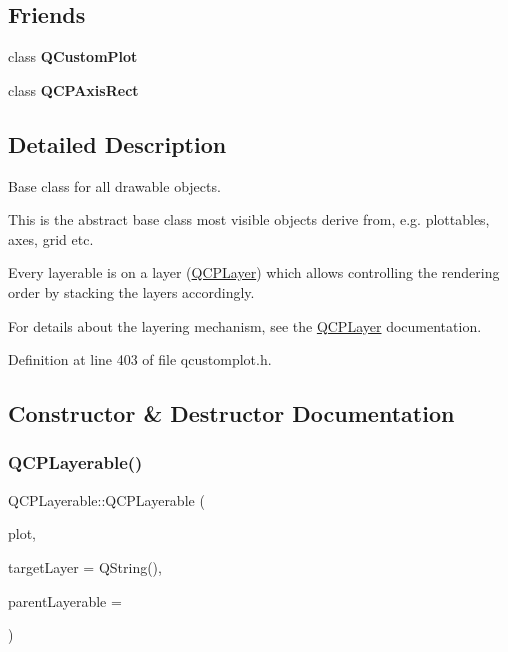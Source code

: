 \subsection*{Friends}
\begin{DoxyCompactItemize}
\item 
\mbox{\label{class_q_c_p_layerable_a1cdf9df76adcfae45261690aa0ca2198}} 
class {\bfseries Q\+Custom\+Plot}
\item 
\mbox{\label{class_q_c_p_layerable_acbf20ecb140f66c5fd1bc64ae0762990}} 
class {\bfseries Q\+C\+P\+Axis\+Rect}
\end{DoxyCompactItemize}


\subsection{Detailed Description}
Base class for all drawable objects. 

This is the abstract base class most visible objects derive from, e.\+g. plottables, axes, grid etc.

Every layerable is on a layer (\hyperlink{class_q_c_p_layer}{Q\+C\+P\+Layer}) which allows controlling the rendering order by stacking the layers accordingly.

For details about the layering mechanism, see the \hyperlink{class_q_c_p_layer}{Q\+C\+P\+Layer} documentation. 

Definition at line 403 of file qcustomplot.\+h.



\subsection{Constructor \& Destructor Documentation}
\mbox{\label{class_q_c_p_layerable_a74c0fa237f29bf0e49565013fc5d1ec0}} 
\subsubsection{\texorpdfstring{Q\+C\+P\+Layerable()}{QCPLayerable()}}
{\footnotesize\ttfamily Q\+C\+P\+Layerable\+::\+Q\+C\+P\+Layerable (\begin{DoxyParamCaption}\item[{\hyperlink{class_q_custom_plot}{Q\+Custom\+Plot} $\ast$}]{plot,  }\item[{Q\+String}]{target\+Layer = {\ttfamily QString()},  }\item[{\hyperlink{class_q_c_p_layerable}{Q\+C\+P\+Layerable} $\ast$}]{parent\+Layerable = {} }\end{DoxyParamCaption})}

